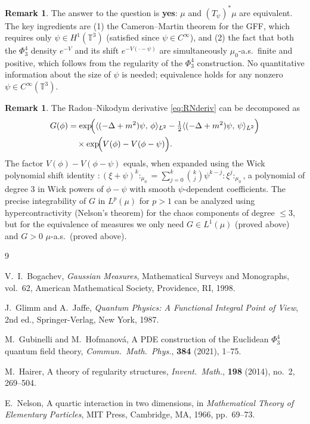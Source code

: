 \documentclass[12pt]{article}
\theoremstyle{definition}
\newtheorem{remark}[theorem]{Remark}
\begin{document}
\begin{remark}
The answer to the question is \textbf{yes}: $\mu$ and $(T_\psi)^*\mu$ are equivalent.  The
key ingredients are (1) the Cameron--Martin theorem for the GFF, which requires only
$\psi\in H^1(\mathbb{T}^3)$ (satisfied since $\psi\in C^\infty$), and (2) the fact that both
the $\Phi^4_3$ density $e^{-V}$ and its shift $e^{-V(\cdot-\psi)}$ are simultaneously
$\mu_0$-a.s.\ finite and positive, which follows from the regularity of the $\Phi^4_3$
construction.  No quantitative information about the size of $\psi$ is needed; equivalence
holds for any nonzero $\psi\in C^\infty(\mathbb{T}^3)$.
\end{remark}

\begin{remark}
The Radon--Nikodym derivative \eqref{eq:RNderiv} can be decomposed as
\begin{align*}
  G(\phi)
  &= \exp\!\Bigl(\langle(-\Delta+m^2)\psi,\,\phi\rangle_{L^2}
      - \tfrac{1}{2}\langle(-\Delta+m^2)\psi,\,\psi\rangle_{L^2}\Bigr) \\
  &\quad\times\exp\!\Bigl(V(\phi) - V(\phi-\psi)\Bigr).
\end{align*}
The factor $V(\phi)-V(\phi-\psi)$ equals, when expanded using the Wick polynomial shift
identity $:(\xi+\psi)^k:_{\mu_0} = \sum_{j=0}^k \binom{k}{j}\psi^{k-j}:\xi^j:_{\mu_0}$,
a polynomial of degree $3$ in Wick powers of $\phi-\psi$ with smooth $\psi$-dependent
coefficients.  The precise integrability of $G$ in $L^p(\mu)$ for $p>1$ can be analyzed
using hypercontractivity (Nelson's theorem) for the chaos components of degree $\leq 3$,
but for the equivalence of measures we only need $G\in L^1(\mu)$ (proved above) and
$G>0$ $\mu$-a.s.\ (proved above).
\end{remark}

\begin{thebibliography}{9}

V.~I.~Bogachev,
\emph{Gaussian Measures},
Mathematical Surveys and Monographs, vol.~62,
American Mathematical Society, Providence, RI, 1998.

J.~Glimm and A.~Jaffe,
\emph{Quantum Physics: A Functional Integral Point of View},
2nd ed., Springer-Verlag, New York, 1987.

M.~Gubinelli and M.~Hofmanov\'{a},
A PDE construction of the Euclidean $\Phi^4_3$ quantum field theory,
\emph{Commun.\ Math.\ Phys.}, \textbf{384} (2021), 1–75.

M.~Hairer,
A theory of regularity structures,
\emph{Invent.\ Math.}, \textbf{198} (2014), no.~2, 269–504.

E.~Nelson,
A quartic interaction in two dimensions,
in \emph{Mathematical Theory of Elementary Particles}, MIT Press, Cambridge, MA, 1966,
pp.~69–73.

\end{thebibliography}
\end{document}
